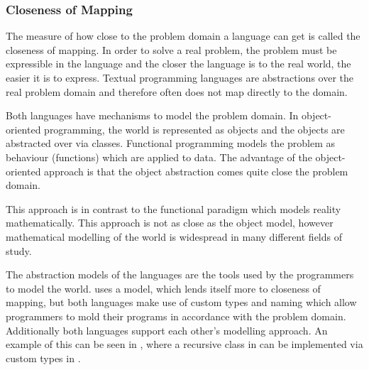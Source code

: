 \subsubsection{Closeness of Mapping}
The measure of how close to the problem domain a language can get is called the closeness of mapping. In order to solve a real problem, the problem must be expressible in the language and the closer the language is to the real world, the easier it is to express\cite{green1996usability}. Textual programming languages are abstractions over the real problem domain and therefore often does not map directly to the domain.

Both languages have mechanisms to model the problem domain. In object-oriented programming, the world is represented as objects and the objects are abstracted over via classes\cite{kindler2011object}. Functional programming models the problem as behaviour (functions) which are applied to data\cite{hughes1989functional}. The advantage of the object-oriented approach is that the object abstraction comes quite close the problem domain.


This approach is in contrast to the functional paradigm which models reality mathematically. This approach is not as close as the object model, however mathematical modelling of the world is widespread in many different fields of study.


The abstraction models of the languages are the tools used by the programmers to model the world. \cs uses a model, which lends itself more to closeness of mapping, but both languages make use of custom types and naming which allow programmers to mold their programs in accordance with the problem domain. Additionally both languages support each other's modelling approach. An example of this can be seen in , where a recursive class in \cs can be implemented via custom types in \fs.

